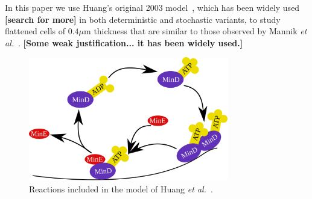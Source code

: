\documentclass[10pt,letterpaper]{article}
\newcommand\micron{\ensuremath{\mu\text{m}}}
\newcommand{\red}[1]{{\bf \color{red} #1}}
\newcommand{\fixme}[1]{\red{[#1]}}
\begin{document}
In this paper we use Huang's original 2003
model~\cite{huang2003dynamic}, which has been widely
used~\cite{hattne2005stochastic} \fixme{search for more} in both
deterministic and stochastic variants, to study flattened cells of
$0.4\micron$ thickness that are similar to those observed by Mannik
\emph{et al.}~\cite{mannik2009bacterial}.  \fixme{Some weak
  justification... it has been widely used.}

\begin{figure}
  \includegraphics[width=8.7cm]{reactions}
  \caption{Reactions included in the model of Huang \emph{et
      al.}~\cite{huang2003dynamic}.}\label{fig:reactions}
\end{figure}







\end{document}
